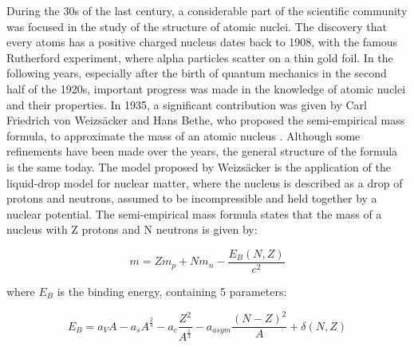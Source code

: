 During the 30s of the last century, a considerable part of the scientific community was focused in the study of the structure of atomic nuclei. The discovery that every atoms has a positive charged nucleus dates back to 1908, with the famous Rutherford experiment, where alpha particles scatter on a thin gold foil. In the following years, especially after the birth of quantum mechanics in the second half of the 1920s, important progress was made in the knowledge of atomic nuclei and their properties. In 1935, a significant contribution was given by Carl Friedrich von Weizsäcker and Hans Bethe, who proposed the semi-empirical mass formula, to approximate the mass of an atomic nucleus \cite{Bethe:1936zz}. Although some refinements have been made over the years, the general structure of the formula is the same today. 
The model proposed by Weizsäcker is the application of the liquid-drop model for nuclear matter, where the nucleus is described as a drop of protons and neutrons, assumed to be incompressible and held together by a nuclear potential. The semi-empirical mass formula states that the mass of a nucleus with Z protons and N neutrons is given by: 

\begin{equation}
m = Zm_{p} + Nm_{n} - \frac{E_{B}(N,Z)}{c^{2}}
\end{equation}

where $E_{B}$ is the binding energy, containing 5 parameters:

\begin{equation}
E_{B} = a_{V}A -  a_{s}A^{\frac{2}{3}} - a_{c}\dfrac{Z^{2}}{A^{\frac{1}{3}}} -a_{asym}\dfrac{(N - Z)^{2}}{A} + \delta(N,Z)
\end{equation}

